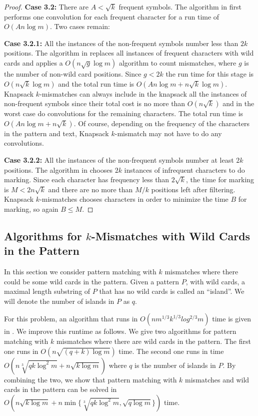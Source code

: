 \begin{proof}
{\bf Case 3.2:} There are $A < \sqrt{k}$ frequent symbols. The
algorithm in \cite{ALP04} first performs one convolution for each frequent
character for a run time of $O(A n \log m)$.
Two cases remain:

{\bf Case 3.2.1:} All the instances of the non-frequent symbols number less than
$2k$ positions. The algorithm in \cite{ALP04} replaces all instances of frequent
characters with wild cards and applies a $O(n\sqrt{g} \log{m})$ algorithm to
count mismatches, where $g$ is the number of non-wild card positions. Since
$g<2k$ the run time for this stage is $O(n\sqrt{k} \log{m})$ and the total
run time is $O(An\log m + n\sqrt{k} \log{m})$.
Knapsack $k$-mismatches can always include in the knapsack all the
instances of non-frequent symbols since their total cost is no more than
$O(n\sqrt{k})$ and in the worst case do convolutions for the remaining
characters. The total run time is $O(An\log m + n\sqrt{k})$. Of course,
depending on the frequency of the characters in the pattern and text, Knapsack
$k$-mismatch may not have to do any convolutions.

{\bf Case 3.2.2:} All the instances of the non-frequent symbols number at
least $2k$ positions. The algorithm in \cite{ALP04} chooses $2k$ instances of
infrequent characters to do marking. Since each character has frequency less
than $2\sqrt{k}$, the time for marking is $M < 2n\sqrt{k}$ and there are no more
than $M/k$ positions left after filtering. Knapsack
$k$-mismatches chooses characters in order to minimize the time $B$
for marking, so again $B \leq M$.
\end{proof}

\subsection{Algorithms for $k$-Mismatches with Wild Cards in the Pattern}
\label{sec_nsqrtk_wild}

In this section we consider pattern matching with $k$ mismatches
where there could be some wild cards in the pattern.  Given a pattern $P$,
with wild cards, a maximal length substring of $P$ that has no wild cards is called an ``island''.
We will denote the number of islands in $P$ as $q$.

For this problem, an algorithm that
runs in $O(nm^{1/3}k^{1/3}log^{2/3}m)$ time is given in \cite{CP10}.
We improve this runtime as follows.  We give two algorithms for pattern matching
with $k$ mismatches where there are wild cards in the pattern.
The first one runs in $O(n\sqrt{(q+k)\log m})$ time. 
The second one runs in time $O(n\sqrt[3]{qk\log^2 m} +
n\sqrt{k\log m})$ where $q$ is the number of islands in $P$. By combining the
two, we show that pattern matching with $k$ mismatches and wild cards in the
pattern can be solved in $O(n\sqrt{k\log m}+n\min\{\sqrt[3]{qk\log^2 m},\sqrt{q\log m}\})$ time.

